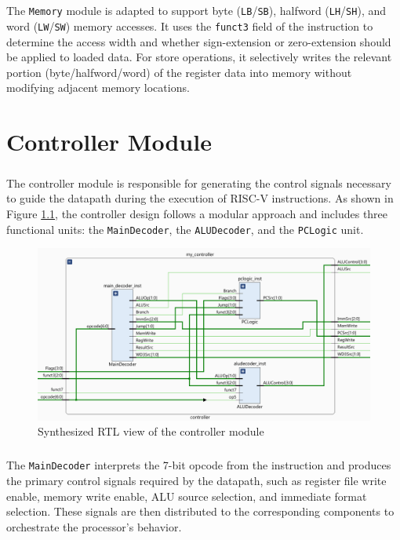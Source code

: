 \documentclass[12pt]{report}
\begin{document}
\paragraph{}
The \texttt{Memory} module is adapted to support byte (\texttt{LB}/\texttt{SB}), halfword (\texttt{LH}/\texttt{SH}), and word (\texttt{LW}/\texttt{SW}) memory accesses. It uses the \texttt{funct3} field of the instruction to determine the access width and whether sign-extension or zero-extension should be applied to loaded data. For store operations, it selectively writes the relevant portion (byte/halfword/word) of the register data into memory without modifying adjacent memory locations.


\chapter{Controller Module}

\paragraph{}
The controller module is responsible for generating the control signals necessary to guide the datapath during the execution of RISC-V instructions. As shown in Figure \ref{fig:controller}, the controller design follows a modular approach and includes three functional units: the \texttt{MainDecoder}, the \texttt{ALUDecoder}, and the \texttt{PCLogic} unit.

\begin{figure}[h]
    \centering
    \includegraphics[width=\textwidth]{figures/controller_rtl.png}
    \caption{Synthesized RTL view of the controller module}
    \label{fig:controller}
\end{figure}

\paragraph{}
The \texttt{MainDecoder} interprets the 7-bit opcode from the instruction and produces the primary control signals required by the datapath, such as register file write enable, memory write enable, ALU source selection, and immediate format selection. These signals are then distributed to the corresponding components to orchestrate the processor's behavior.
\end{document}
